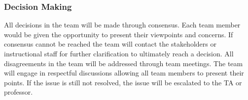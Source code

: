\documentclass{article}
\begin{document}
\subsubsection*{Decision Making} 
All decisions in the team will be made through consensus. Each team member would be given the opportunity to present their viewpoints and concerns. If consensus cannot be reached the team will contact the stakeholders or instructional staff for further clarification to ultimately reach a decision. All disagreements in the team will be addressed through team meetings. The team will engage in respectful discussions allowing all team members to present their points. If the issue is still not resolved, the issue will be escalated to the TA or professor.
\end{document}
